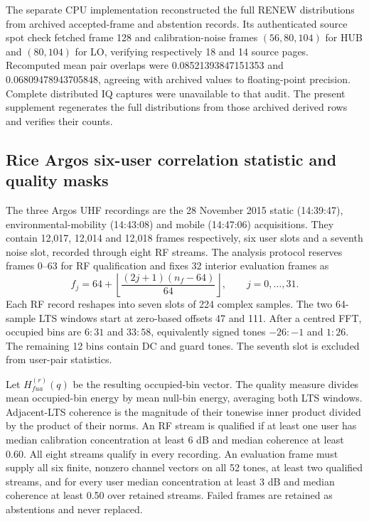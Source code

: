 \documentclass[10pt,letterpaper]{article}
\begin{document}
The separate CPU implementation reconstructed the full RENEW distributions from archived accepted-frame
and abstention records. Its authenticated source spot check fetched frame 128
and calibration-noise frames $(56,80,104)$ for HUB and $(80,104)$ for LO,
verifying respectively 18 and 14 source pages. Recomputed mean pair overlaps
were 0.08521393847151353 and 0.06809478943705848, agreeing with archived values
to floating-point precision. Complete distributed IQ captures were unavailable
to that audit. The present supplement regenerates the full distributions from
those archived derived rows and verifies their counts.

\subsection*{Rice Argos six-user correlation statistic and quality masks}
The three Argos UHF recordings are the 28 November 2015 static (14:39:47),
environmental-mobility (14:43:08) and mobile (14:47:06) acquisitions. They contain
12,017, 12,014 and 12,018 frames respectively, six user slots and a seventh
noise slot, recorded through eight RF streams. The analysis protocol reserves
frames 0--63 for RF qualification and fixes 32 interior evaluation frames as
\begin{equation}
 f_j=64+\left\lfloor\frac{(2j+1)(n_f-64)}{64}\right\rfloor,
 \qquad j=0,\ldots,31.
\end{equation}
Each RF record reshapes into seven slots of 224 complex samples. The two
64-sample LTS windows start at zero-based offsets 47 and 111. After a centred
FFT, occupied bins are $6{:}31$ and $33{:}58$, equivalently signed tones
$-26{:}-1$ and $1{:}26$. The remaining 12 bins contain DC and guard tones.
The seventh slot is excluded from user-pair statistics.

Let $H^{(r)}_{fua}(q)$ be the resulting occupied-bin vector. The quality
measure divides mean occupied-bin energy by mean null-bin energy, averaging
both LTS windows. Adjacent-LTS coherence is the magnitude of their tonewise
inner product divided by the product of their norms. An RF stream is
qualified if at least one user has median calibration concentration at least
6 dB and median coherence at least 0.60. All eight streams qualify in every
recording. An evaluation frame must supply all six finite, nonzero channel
vectors on all 52 tones, at least two qualified streams, and for every user
median concentration at least 3 dB and median coherence at least 0.50 over
retained streams. Failed frames are retained as abstentions and never replaced.
\end{document}
